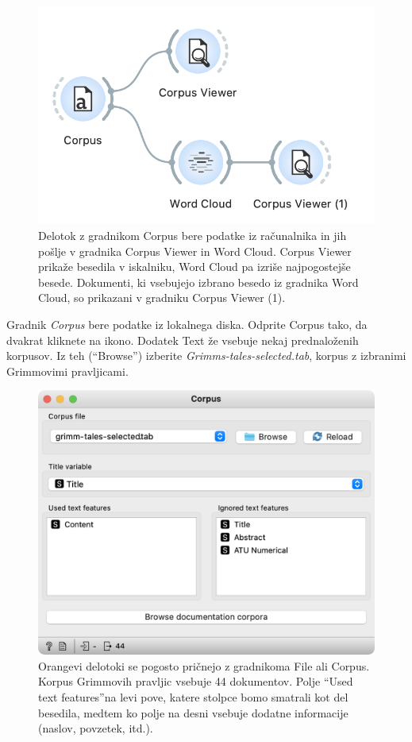 \begin{figure}[h]
  \centering
  \includegraphics[width=0.9\linewidth]{workflow-ex.png}%
  \caption{Delotok z gradnikom Corpus bere podatke iz računalnika in jih pošlje v gradnika Corpus Viewer in Word Cloud.  Corpus Viewer prikaže besedila v iskalniku, Word Cloud pa izriše najpogostejše besede. Dokumenti, ki vsebujejo izbrano besedo iz gradnika Word Cloud, so prikazani v gradniku Corpus Viewer (1).}
  \label{fig:workflow-fig2}
\end{figure}

Gradnik \textit{Corpus} bere podatke iz lokalnega diska. Odprite Corpus tako, da dvakrat kliknete na ikono. Dodatek Text že vsebuje nekaj prednaloženih korpusov. Iz teh (“Browse”) izberite \textit{Grimms-tales-selected.tab}, korpus z izbranimi Grimmovimi pravljicami. 

\begin{figure}[h]
  \centering
  \includegraphics[width=\linewidth]{corpus.png}%
  \caption{Orangevi delotoki se pogosto pričnejo z gradnikoma File ali Corpus. Korpus Grimmovih pravljic vsebuje 44 dokumentov.  Polje “Used text features”na levi pove, katere stolpce bomo smatrali kot del besedila, medtem ko polje na desni vsebuje dodatne informacije (naslov, povzetek, itd.).}
  \label{fig:workflow-fig3}
\end{figure}

